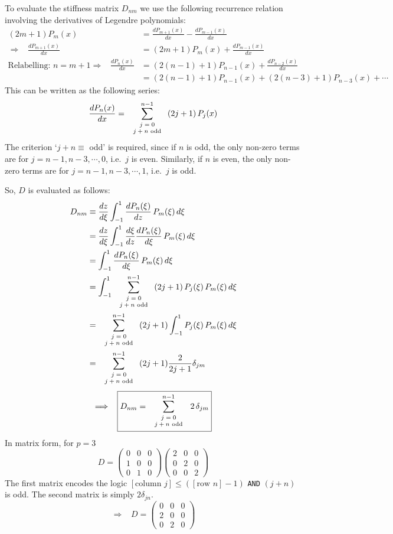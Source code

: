 \documentclass[10pt,a4paper]{article}
\begin{document}
To evaluate the stiffness matrix $D_{nm}$ we use the following recurrence
relation involving the derivatives of Legendre polynomials:
\begin{align*}
(2m+1) P_m(x) & = \frac{dP_{m+1}(x)}{dx} - \frac{dP_{m-1}(x)}{dx} \\
\Longrightarrow \;\;\; \frac{dP_{m+1}(x)}{dx} & = (2m+1) P_m(x) +
\frac{dP_{m-1}(x)}{dx} \\
\mbox{Relabelling: $n=m+1$} \Longrightarrow \;\;\; \frac{dP_n(x)}{dx} & =
\left( 2(n-1)+1 \right) P_{n-1}(x) +
\frac{dP_{n-2}(x)}{dx} \\
& = \left(2(n-1)+1\right) P_{n-1}(x) + \left(2(n-3)+1\right) P_{n-3}(x) +
\cdots
\end{align*}
This can be written as the following series:
\newcommand{\oddsum}
{ \sum_{
\mbox{\scriptsize{ $\begin{array}{c} j=0 \\ j+n \mbox{ odd} \end{array}$ }}
}^{n-1} }
\[
\frac{dP_n(x)}{dx} =
\oddsum (2j+1) \, P_j(x)
\]
The criterion `$j+n \equiv $ odd' is required, since if $n$ is odd, the only
non-zero terms are for $j=n-1,n-3,\cdots,0$, i.e.\ $j$ is even. Similarly, if
$n$ is even, the only non-zero terms are for $j=n-1,n-3,\cdots,1$, i.e.\ $j$
is odd.

So, $D$ is evaluated as follows:
\begin{align*}
D_{nm} & \equiv \frac{dz}{d\xi} \int_{-1}^{1} \frac{dP_n(\xi)}{dz} \, P_m(\xi)
\, d\xi \\
& = \frac{dz}{d\xi} \int_{-1}^{1} \frac{d\xi}{dz} \frac{dP_n(\xi)}{d\xi} \, P_m(\xi)
\, d\xi \\
& = \int_{-1}^{1} \frac{dP_n(\xi)}{d\xi} \, P_m(\xi) \, d\xi \\
& = \int_{-1}^{1} \oddsum (2j+1) \, P_j(\xi) \, P_m(\xi) \, d\xi \\
& = \oddsum (2j+1) \int_{-1}^{1} P_j(\xi) \, P_m(\xi) \, d\xi \\
& = \oddsum (2j+1) \frac{2}{2j+1} \delta_{jm}
\end{align*}
\[
\Longrightarrow \;\;\; \boxed{ D_{nm} = \oddsum 2 \, \delta_{jm} }
\]
In matrix form, for $p=3$
\[
D = \left( \begin{array}{ccc}
0 & 0 & 0 \\
1 & 0 & 0 \\
0 & 1 & 0
\end{array} \right)
\left( \begin{array}{ccc}
2 & 0 & 0 \\
0 & 2 & 0 \\
0 & 0 & 2
\end{array} \right)
\]
The first matrix encodes the logic $[\mbox{column } j] \leq ([\mbox{row } n]-1)$
\texttt{AND} $(j+n)$ is odd. The second matrix is simply $2 \delta_{jn}$.
\[
\Longrightarrow \;\;\; D = \left( \begin{array}{ccc}
0 & 0 & 0 \\
2 & 0 & 0 \\
0 & 2 & 0
\end{array} \right)
\]
\end{document}
